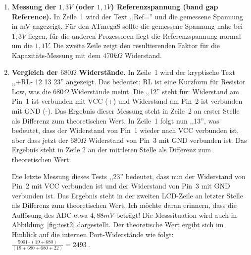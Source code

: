 \begin{enumerate}

\item {\bf Messung der \(1,3V\) (oder \(1,1V\)) Referenzspannung (band gap Reference).} In Zeile~1 wird der Text ,,Ref='' und die
gemessene Spannung in mV angezeigt.
Für den ATmega8 sollte die gemessene Spannung nahe bei \(1,3V\) liegen, für die anderen Prozessoren liegt
die Referenzspannung normal um die \(1,1V\).
Die zweite Zeile zeigt den resultierenden Faktor für die Kapazitäts-Messung mit dem \(470k\Omega\) Widerstand.

\item {\bf Vergleich der \(680\Omega\) Widerstände.} 
In Zeile~1 wird der kryptische Text  ,,+RL- 12 13 23'' angezeigt. Das bedeutet:
RL ist eine Kurzform für Resistor Low, was die \(680\Omega\) Widerstände meint. Die ,,12'' steht für: 
Widerstand am Pin~1 ist verbunden mit VCC (+) und Widerstand am Pin~2 ist verbunden mit GND (-). 
Das Ergebnis dieser Messung steht in Zeile~2 an erster Stelle als Differenz zum theoretischen Wert.
 In Zeile~1 folgt nun ,,13'', was bedeutet, dass der Widerstand von Pin~1 wieder nach VCC verbunden ist,
aber dass jetzt der \(680\Omega\) Widerstand von Pin~3  mit GND verbunden ist.
Das Ergebnis steht in Zeile 2 an der mittleren Stelle als Differenz zum theoretischen Wert.

Die letzte Messung dieses Tests ,,23'' bedeutet, dass nun der Widerstand von Pin~2 mit VCC verbunden ist und
der Widerstand von Pin~3 mit GND verbunden ist.
Das Ergebnis steht in der zweiten LCD-Zeile an letzter Stelle als Differenz zum theoretischen Wert.
Ich möchte daran erinnern, dass die Auflösung des ADC etwa \(4,88mV\) beträgt!
Die Messsituation wird auch in Abbildung~\ref{fig:test2} dargestellt.
Der theoretische Wert ergibt sich im Hinblick auf die internen Port-Widerstände wie folgt:
\(\frac{5001 \cdot  (19+680)}{ (19+680+680+22)} = 2493\) .


\end{enumerate}
